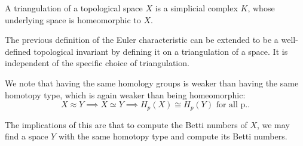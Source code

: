\begin{definition}
    A triangulation of a topological space $X$ is a simplicial complex $K$, whose underlying space is homeomorphic to $X$.
\end{definition}

The previous definition of the Euler characteristic can be extended to be a well-defined topological invariant by defining it on a triangulation of a space. It is independent of the specific choice of triangulation.

We note that having the same homology groups is weaker than having the same homotopy type, which is again weaker than being homeomorphic:
$$
X \approx Y \implies X \simeq Y \implies H_p(X) \cong H_p(Y) \text{ for all p.}.
$$

The implications of this are that to compute the Betti numbers of $X$, we may find a space $Y$ with the same homotopy type and compute its Betti numbers.

